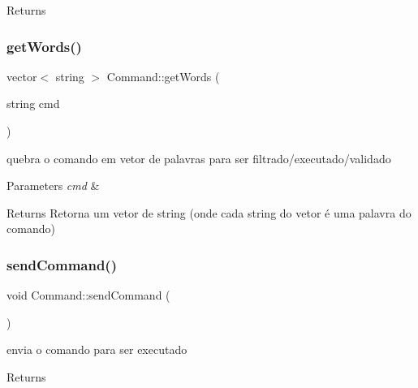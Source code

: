 \begin{DoxyReturn}{Returns}

\end{DoxyReturn}
\mbox{\label{classCommand_a591435fa9400bb5c13150092ee3b1c70}} 
\subsubsection{\texorpdfstring{get\+Words()}{getWords()}}
{\footnotesize\ttfamily vector$<$ string $>$ Command\+::get\+Words (\begin{DoxyParamCaption}\item[{string}]{cmd }\end{DoxyParamCaption})}



quebra o comando em vetor de palavras para ser filtrado/executado/validado 


\begin{DoxyParams}{Parameters}
{\em cmd} & \\
\hline
\end{DoxyParams}
\begin{DoxyReturn}{Returns}
Retorna um vetor de string (onde cada string do vetor é uma palavra do comando) 
\end{DoxyReturn}
\mbox{\label{classCommand_a911de585d69707fce024dcbdd7bba32f}} 
\subsubsection{\texorpdfstring{send\+Command()}{sendCommand()}}
{\footnotesize\ttfamily void Command\+::send\+Command (\begin{DoxyParamCaption}{ }\end{DoxyParamCaption})}



envia o comando para ser executado 

\begin{DoxyReturn}{Returns}

\end{DoxyReturn}
\mbox{\label{classCommand_ac90a4a22d91ef08297c0aeb4368f8393}} 
